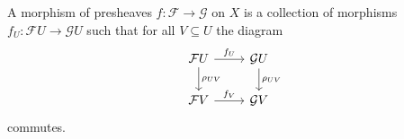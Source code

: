 A morphism of presheaves $f\colon \mathcal{F}\to \mathcal{G}$ on $X$ is a collection of morphisms
$f_U\colon \mathcal{F}U\to \mathcal{G}U$ such that for all $V \subseteq U$ the diagram
\[
	\begin{tikzcd}
		\mathcal{F}U\ar[r, "f_U"]\ar[d, "\rho_{UV}"] & \mathcal{G}U\ar[d, "\rho_{UV}"]\\
		\mathcal{F}V\ar[r, "f_V"] & \mathcal{G}V
	\end{tikzcd}
	\]
commutes.

